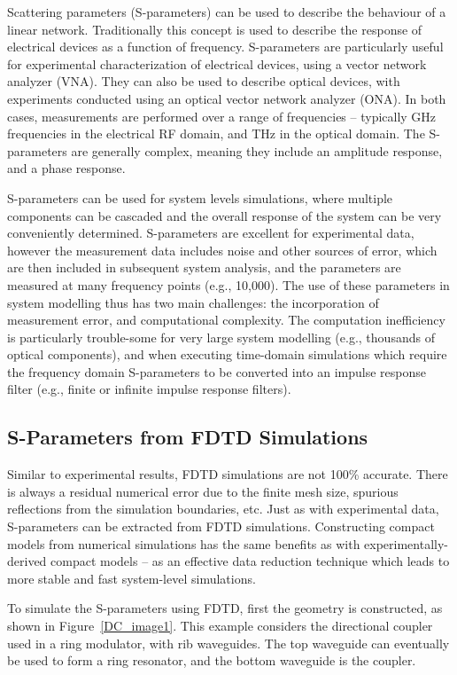 \documentclass[journal]{spie}
\begin{document}
Scattering parameters (S-parameters) can be used to describe the behaviour of a linear network.  Traditionally this concept is used to describe the response of electrical devices as a function of frequency.  S-parameters are particularly useful for experimental characterization of electrical devices, using a vector network analyzer (VNA).   They can also be used to describe optical devices, with experiments conducted using an optical vector network analyzer (ONA).  In both cases, measurements are performed over a range of frequencies -- typically GHz frequencies in the electrical RF domain, and THz in the optical domain.  The S-parameters are generally complex, meaning they include an amplitude response, and a phase response. 

S-parameters can  be used for system levels simulations, where multiple components can be cascaded and the overall response of the system can be very conveniently determined. S-parameters are excellent for experimental data, however the measurement data includes noise and other sources of error, which are then included in subsequent system analysis, and the parameters are measured at many frequency points (e.g., 10,000).  The use of these parameters in system modelling thus has two main challenges: the incorporation of measurement error, and computational complexity.  The computation inefficiency is particularly trouble-some for very large system modelling (e.g., thousands of optical components), and when executing time-domain simulations which require the frequency domain S-parameters to be converted into an impulse response filter (e.g., finite or infinite impulse response filters).

\subsection{S-Parameters from FDTD Simulations}

Similar to experimental results, FDTD simulations are not 100\% accurate.  There is always a residual numerical error due to the finite mesh size, spurious reflections from the simulation boundaries, etc.  Just as with experimental data, S-parameters can be extracted from FDTD simulations.  Constructing compact models from numerical simulations has the same benefits as with experimentally-derived compact models -- as an effective data reduction technique which leads to more stable and fast system-level simulations.

 To simulate the S-parameters using FDTD, first the geometry is constructed, as shown in Figure~\ref{DC_image1}. This example considers the directional coupler used in a ring modulator, with rib waveguides. The top waveguide can eventually be used to form a ring resonator, and the bottom waveguide is the coupler.
\end{document}
